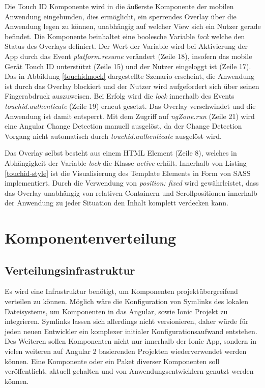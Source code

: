 Die Touch ID Komponente wird in die äußerste Komponente der mobilen Anwendung eingebunden,
dies ermöglicht, ein sperrendes Overlay über die Anwendung legen zu können, unabhängig auf welcher
View sich ein Nutzer gerade befindet. Die Komponente beinhaltet eine boolesche Variable \emph{lock}
welche den Status des Overlays definiert. Der Wert der Variable wird bei Aktivierung der App durch das Event \emph{platform.resume}
verändert (Zeile 18), insofern das mobile Gerät Touch ID unterstützt (Zeile 15) und der Nutzer eingeloggt ist (Zeile 17).
Das in Abbildung \ref{touchidmock} dargestellte Szenario erscheint, die Anwendung ist durch das Overlay blockiert und der Nutzer wird aufgefordert sich über seinen Fingerabdruck auszuweisen.
Bei Erfolg wird die \emph{lock} innerhalb des Events \emph{touchid.authenticate} (Zeile 19) erneut gesetzt.
Das Overlay verschwindet und die Anwendung ist damit entsperrt. Mit dem Zugriff auf \emph{ngZone.run} (Zeile 21) wird eine Angular Change Detection manuell ausgelöst, da der Change Detection Vorgang nicht automatisch durch \emph{touchid.authenticate} ausgelöst wird.

Das Overlay selbst besteht aus einem \ac{HTML} Element (Zeile 8), welches in Abhängigkeit der Variable \emph{lock} die Klasse \emph{active} erhält.
Innerhalb von Listing \ref{touchid-style} ist die Visualisierung des Template Elements in Form von \ac{SASS} implementiert.
Durch die Verwendung von \emph{position: fixed} wird gewährleistet, dass das Overlay unabhängig von relativen Containern und Scrollpositionen innerhalb der Anwendung zu jeder Situation den Inhalt komplett verdecken kann.









\newpage
\section{Komponentenverteilung}

\subsection{Verteilungsinfrastruktur}

Es wird eine Infrastruktur benötigt, um Komponenten projektübergreifend verteilen zu können.
Möglich wäre die Konfiguration von Symlinks des lokalen Dateisystems, um Komponenten in das Angular,
sowie Ionic Projekt zu integrieren. Symlinks lassen sich allerdings nicht versionieren, daher würde
für jeden neuen Entwickler ein komplexer initialer Konfigurationsaufwand entstehen.
Des Weiteren sollen Komponenten nicht nur innerhalb der Ionic App,
sondern in vielen weiteren auf Angular 2 basierenden Projekten wiederverwendet werden können.
Eine Komponente oder ein Paket diverser Komponenten soll veröffentlicht, aktuell
gehalten und von Anwendungsentwicklern genutzt werden können.

